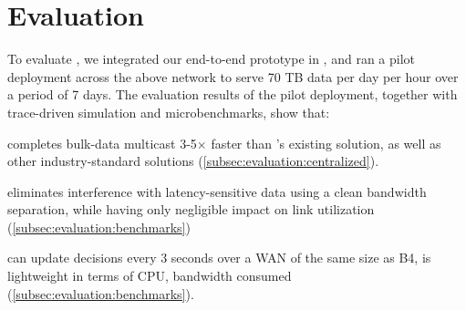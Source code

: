 \section{Evaluation}
\label{sec:evaluation}

To evaluate \name, we integrated our end-to-end prototype in \company, and ran a pilot deployment across the above network to serve 70 TB data per day per hour  over a period of 7 days.
The evaluation results of the pilot deployment, together with trace-driven simulation and microbenchmarks, show that:
\begin{packedenumerate}
\item \name completes bulk-data multicast 3-5$\times$ faster than \company's existing solution, as well as other industry-standard solutions (\Section\ref{subsec:evaluation:centralized}).
\item \name eliminates interference with latency-sensitive data using a clean bandwidth separation, while having only negligible impact on link utilization (\Section\ref{subsec:evaluation:benchmarks})
\item \name can update decisions every 3 seconds over a WAN of the same size as B4, is lightweight in terms of CPU, bandwidth consumed (\Section\ref{subsec:evaluation:benchmarks}).
\end{packedenumerate}

